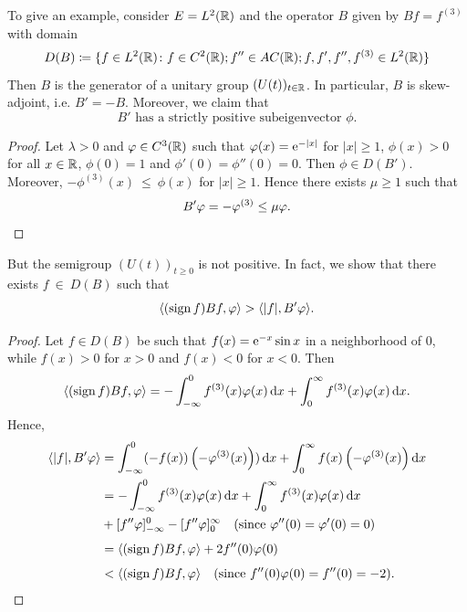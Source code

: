 To give an example, consider $E = L^{2}(\mathbb{R})$ and the operator $B$ given by 
$Bf = f^{(3)}$ with domain
\[
D(B) \coloneq \{f \in L^{2}(\mathbb{R}) \colon f \in C^{2}(\mathbb{R}); f'' \in AC(\mathbb{R}) ; f,f',f'',f^{(3)} \in L^{2}(\mathbb{R})\}
\]
Then $B$ is the generator of a unitary group $(U(t))_{t \in \mathbb{R}}$. 
In particular, $B$ is skew-adjoint, i.e. $B' = -B$.
Moreover, we claim that
\begin{equation}\label{eq:c2-3.18}
B' \text{ has a strictly positive subeigenvector } \phi.
\end{equation}
\begin{proof}
Let $\lambda > 0$ and $\phi \in C^{3}(\R)$ such that $\phi(x) = \eu^{-|x|}$ for
$|x| \geq 1$, $\phi(x) > 0$ for all $x \in \mathbb{R}$, $\phi(0) = 1$ and $\phi'(0) = \phi''(0) = 0$.
Then $\phi \in D(B')$. 
Moreover, $-\phi^{(3)}(x)~\leq~\phi(x)$ for $|x| \geq 1$. 
Hence there exists $\mu \geq 1$ such that
%
\begin{equation*}
	B'\phi = -\phi^{(3)} \leq \mu\phi.
\qedhere
\end{equation*}
\end{proof}
But the semigroup $(U(t))_{t \geq 0}$ is not positive. 
In fact, we show that there exists $f~\in~D(B)$ such that
\begin{equation}\label{eq:c2-3.19}
\langle(\sign  f)Bf,\phi\rangle > \langle|f|,B'\phi\rangle.
\end{equation}
\begin{proof}
Let $f \in D(B)$ be such that $f(x) = \mathrm{e}^{-x} \sin x$ in a neighborhood of\/ $0$, while $f(x) > 0$ for $x > 0$ and $f(x) < 0$ for $x < 0$. 
Then
\begin{align*}
\langle(\sign  f)Bf,\phi\rangle = - \int_{-\infty}^{0} f^{(3)}(x)\phi(x) \dx + \int_{0}^{\infty} f^{(3)}(x)\phi(x) \dx.
\end{align*}
Hence, 
\begin{align*}
\langle|f|,B'\phi\rangle &= \int_{-\infty}^{0} (-f(x))\left(-\phi^{(3)}(x)\right)) \dx + \int_{0}^{\infty} f(x)\left(-\phi^{(3)}(x)\right) \dx\\
&= - \int_{-\infty}^{0} f^{(3)}(x)\phi(x) \dx + \int_{0}^{\infty} f^{(3)}(x)\phi(x) \dx\\
&+ [f''\phi]_{-\infty}^{0} - [f''\phi]_{0}^{\infty} \quad \text{(since $\phi''(0)=\phi'(0)=0$)}\\[1ex]
&= \langle(\sign  f) Bf,\phi\rangle + 2f''(0)\phi(0)\\[1ex]
&< \langle(\sign  f) Bf,\phi\rangle \quad \text{(since $f''(0)\phi(0) = f''(0) = -2$)}.
\tag*{\qedsymbol}%
\end{align*}
\let\qedsymbol\relax
\end{proof}
